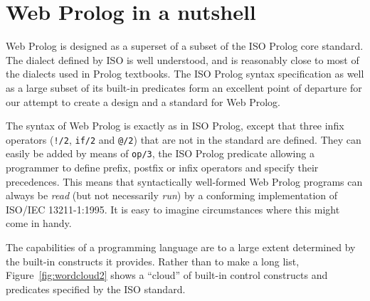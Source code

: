 %
%
%
%
%

\section{Web Prolog in a nutshell}\label{sec:wp-nutshell}

Web Prolog is designed as a superset of a subset of the ISO Prolog core standard. The dialect defined by ISO is well understood, and is reasonably close to most of the dialects used in Prolog textbooks. The ISO Prolog syntax specification as well as a large subset of its built-in predicates form an excellent point of departure for our attempt to create a design and a standard for Web Prolog. 

The syntax of Web Prolog is exactly as in ISO Prolog, except that three infix operators (\texttt{!/2}, \texttt{if/2} and \texttt{@/2}) that are not in the standard are defined. They can easily be added by means of \texttt{op/3}, the ISO Prolog predicate allowing a programmer to define prefix, postfix or infix operators and specify their precedences. This means that syntactically well-formed Web Prolog programs can always be \textit{read} (but not necessarily \textit{run}) by a conforming implementation of ISO/IEC 13211-1:1995. It is easy to imagine circumstances where this might come in handy. 

The capabilities of a programming language are to a large extent determined by the built-in constructs it provides. Rather than to make a long list, Figure~\ref{fig:wordcloud2} shows a ``cloud'' of built-in control constructs and predicates specified by the ISO standard. 

